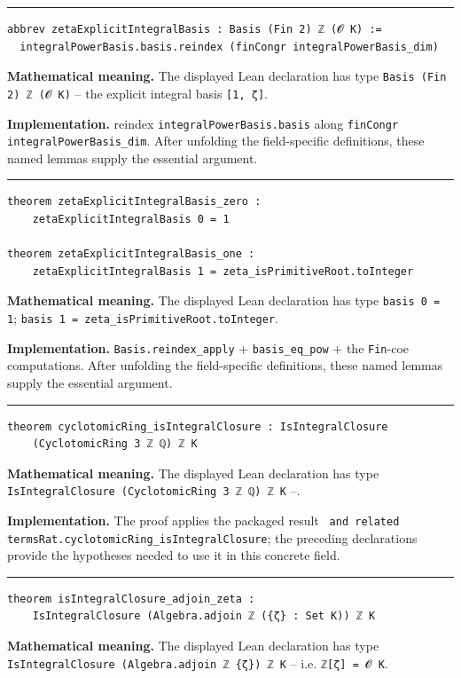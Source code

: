 \documentclass[UTF8,a4paper,11pt,fontset=fandol]{ctexart}
\theoremstyle{definition}
\newcommand{\statementsep}{\par\medskip\hrule\medskip}
\begin{document}
\statementsep
\begin{verbatim}
abbrev zetaExplicitIntegralBasis : Basis (Fin 2) ℤ (𝓞 K) :=
  integralPowerBasis.basis.reindex (finCongr integralPowerBasis_dim)
\end{verbatim}
\noindent\textbf{Mathematical meaning.} The displayed Lean declaration has type \texttt{Basis (Fin 2) ℤ (𝓞 K)} -- the explicit integral basis \texttt{[1, ζ]}.\par
\noindent\textbf{Implementation.} reindex \texttt{integralPowerBasis.\allowbreak{}basis} along \texttt{finCongr integralPowerBasis\_\allowbreak{}dim}. After unfolding the field-specific definitions, these named lemmas supply the essential argument.\par
\statementsep
\begin{verbatim}
theorem zetaExplicitIntegralBasis_zero :
    zetaExplicitIntegralBasis 0 = 1

theorem zetaExplicitIntegralBasis_one :
    zetaExplicitIntegralBasis 1 = zeta_isPrimitiveRoot.toInteger
\end{verbatim}
\noindent\textbf{Mathematical meaning.} The displayed Lean declaration has type \texttt{basis 0 = 1}; \texttt{basis 1 = zeta\_\allowbreak{}isPrimitiveRoot.\allowbreak{}toInteger}.\par
\noindent\textbf{Implementation.} \texttt{Basis.\allowbreak{}reindex\_\allowbreak{}apply} + \texttt{basis\_\allowbreak{}eq\_\allowbreak{}pow} + the \texttt{Fin}-coe computations. After unfolding the field-specific definitions, these named lemmas supply the essential argument.\par
\statementsep
\begin{verbatim}
theorem cyclotomicRing_isIntegralClosure : IsIntegralClosure
    (CyclotomicRing 3 ℤ ℚ) ℤ K
\end{verbatim}
\noindent\textbf{Mathematical meaning.} The displayed Lean declaration has type \texttt{IsIntegralClosure (CyclotomicRing 3 ℤ ℚ) ℤ K} --.\par
\noindent\textbf{Implementation.} The proof applies the packaged result \texttt{ and related termsRat.\allowbreak{}cyclotomicRing\_\allowbreak{}isIntegralClosure}; the preceding declarations provide the hypotheses needed to use it in this concrete field.\par
\statementsep
\begin{verbatim}
theorem isIntegralClosure_adjoin_zeta :
    IsIntegralClosure (Algebra.adjoin ℤ ({ζ} : Set K)) ℤ K
\end{verbatim}
\noindent\textbf{Mathematical meaning.} The displayed Lean declaration has type \texttt{IsIntegralClosure (Algebra.\allowbreak{}adjoin ℤ \{ζ\}) ℤ K} -- i.e. \texttt{ℤ[ζ] = 𝓞 K}.\par
\end{document}

